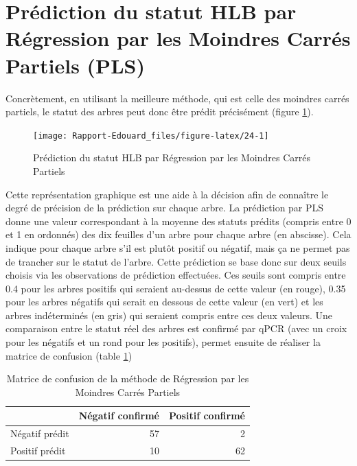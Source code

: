 \documentclass[
  11pt,
  french,
  a4paper,
  extrafontsizes,onecolumn,openright
  ]{memoir}
\begin{document}
\vfill
\newpage

\hypertarget{pruxe9diction-du-statut-hlb-par-ruxe9gression-par-les-moindres-carruxe9s-partiels-pls}{%
\section{Prédiction du statut HLB par Régression par les Moindres Carrés Partiels (PLS)}\label{pruxe9diction-du-statut-hlb-par-ruxe9gression-par-les-moindres-carruxe9s-partiels-pls}}

Concrètement, en utilisant la meilleure méthode, qui est celle des moindres carrés partiels, le statut des arbres peut donc être prédit précisément (figure \ref{fig:24}).

\scriptsize

\begin{figure}

{\centering \texttt{[image: Rapport-Edouard\_files/figure-latex/24-1]} 

}

\caption{Prédiction du statut HLB par Régression par les Moindres Carrés Partiels}\label{fig:24}
\end{figure}

\normalsize

Cette représentation graphique est une aide à la décision afin de connaître le degré de précision de la prédiction sur chaque arbre. La prédiction par PLS donne une valeur correspondant à la moyenne des statuts prédits (compris entre 0 et 1 en ordonnés) des dix feuilles d'un arbre pour chaque arbre (en abscisse). Cela indique pour chaque arbre s'il est plutôt positif ou négatif, mais ça ne permet pas de trancher sur le statut de l'arbre. Cette prédiction se base donc sur deux seuils choisis via les observations de prédiction effectuées. Ces seuils sont compris entre 0.4 pour les arbres positifs qui seraient au-dessus de cette valeur (en rouge), 0.35 pour les arbres négatifs qui serait en dessous de cette valeur (en vert) et les arbres indéterminés (en gris) qui seraient compris entre ces deux valeurs. Une comparaison entre le statut réel des arbres est confirmé par qPCR (avec un croix pour les négatifs et un rond pour les positifs), permet ensuite de réaliser la matrice de confusion (table \ref{tab:T3})

\vfill
\newpage

\scriptsize

\begin{longtable}[t]{lrr}
\caption{\label{tab:T3}Matrice de confusion de la méthode de Régression par les Moindres Carrés Partiels}\\
\toprule
  & Négatif confirmé & Positif confirmé\\
\midrule
Négatif prédit & 57 & 2\\
Positif prédit & 10 & 62\\
\bottomrule
\end{longtable}
\end{document}

